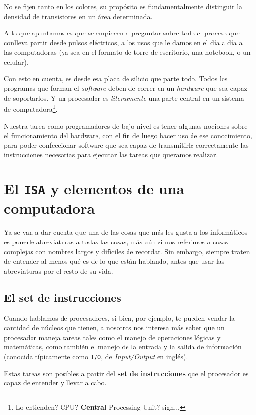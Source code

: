 \documentclass[a4paper, titlepage]{report}
\begin{document}
	No se fijen tanto en los colores, su propósito es fundamentalmente distinguir la densidad de transistores en un área determinada.
	
	A lo que apuntamos es que se empiecen a preguntar sobre todo el proceso que conlleva partir desde pulsos eléctricos, a los usos que le damos en el día a día a las computadoras (ya sea en el formato de torre de escritorio, una notebook, o un celular).
	
	Con esto en cuenta, es desde esa placa de silicio que parte todo. Todos los programas que forman el \textit{software} deben de correr en un \textit{hardware} que sea capaz de soportarlos. Y un procesador es \textit{literalmente} una parte central en un sistema de computadora\footnote{Lo entienden? CPU? \textbf{Central} Processing Unit? sigh...}.
	
	Nuestra tarea como programadores de bajo nivel es tener algunas nociones sobre el funcionamiento del hardware, con el fin de luego hacer uso de ese conocimiento, para poder confeccionar software que sea capaz de transmitirle correctamente las instrucciones necesarias para ejecutar las tareas que queramos realizar. 
	
	\section{El \texttt{ISA} y elementos de una computadora}
	
	Ya se van a dar cuenta que una de las cosas que más les gusta a los informáticos es ponerle abreviaturas a todas las cosas, más aún si nos referimos a cosas complejas con nombres largos y difíciles de recordar. Sin embargo, siempre traten de entender al menos qué es de lo que están hablando, antes que usar las abreviaturas por el resto de su vida.
	
	\subsection{El set de instrucciones}
	
	Cuando hablamos de procesadores, si bien, por ejemplo, te pueden vender la cantidad de núcleos que tienen, a nosotros nos interesa más saber que un procesador maneja tareas tales como el manejo de operaciones lógicas y matemáticas, como también el manejo de la entrada y la salida de información (conocida típicamente como \texttt{I/O}, de \textit{Input/Output} en inglés).
	
	Estas tareas son posibles a partir del \textbf{set de instrucciones} que el procesador es capaz de entender y llevar a cabo. \\
	
\end{document}
